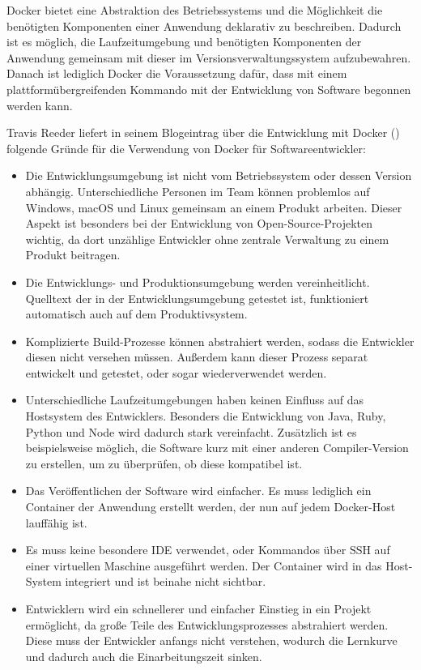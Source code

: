 Docker bietet eine Abstraktion des Betriebssystems und die Möglichkeit die benötigten Komponenten einer Anwendung deklarativ zu beschreiben.
Dadurch ist es möglich, die Laufzeitumgebung und benötigten Komponenten der Anwendung gemeinsam mit dieser im Versionsverwaltungssystem aufzubewahren.
Danach ist lediglich Docker die Voraussetzung dafür, dass mit einem plattformübergreifenden Kommando mit der Entwicklung von Software begonnen werden kann.

Travis Reeder liefert in seinem Blogeintrag über die Entwicklung mit Docker (\autocite{why-docker-for-development:online}) folgende Gründe für die Verwendung von Docker für Softwareentwickler:
\begin{itemize}
    \item Die Entwicklungsumgebung ist nicht vom Betriebssystem oder dessen Version abhängig. Unterschiedliche Personen im Team können problemlos auf Windows, macOS und Linux gemeinsam an einem Produkt arbeiten. Dieser Aspekt ist besonders bei der Entwicklung von Open-Source-Projekten wichtig, da dort unzählige Entwickler ohne zentrale Verwaltung zu einem Produkt beitragen.
    \item Die Entwicklungs- und Produktionsumgebung werden vereinheitlicht. Quelltext der in der Entwicklungsumgebung getestet ist, funktioniert automatisch auch auf dem Produktivsystem.
    \item Komplizierte Build-Prozesse können abstrahiert werden, sodass die Entwickler diesen nicht versehen müssen. Außerdem kann dieser Prozess separat entwickelt und getestet, oder sogar wiederverwendet werden.
    \item Unterschiedliche Laufzeitumgebungen haben keinen Einfluss auf das Hostsystem des Entwicklers. Besonders die Entwicklung von Java, Ruby, Python und Node wird dadurch stark vereinfacht. Zusätzlich ist es beispielsweise möglich, die Software kurz mit einer anderen Compiler-Version zu erstellen, um zu überprüfen, ob diese kompatibel ist.
    \item Das Veröffentlichen der Software wird einfacher. Es muss lediglich ein Container der Anwendung erstellt werden, der nun auf jedem Docker-Host lauffähig ist.
    \item Es muss keine besondere IDE verwendet, oder Kommandos über SSH auf einer virtuellen Maschine ausgeführt werden. Der Container wird in das Host-System integriert und ist beinahe nicht sichtbar.
    \item Entwicklern wird ein schnellerer und einfacher Einstieg in ein Projekt ermöglicht, da große Teile des Entwicklungsprozesses abstrahiert werden. Diese muss der Entwickler anfangs nicht verstehen, wodurch die Lernkurve und dadurch auch die Einarbeitungszeit sinken.
\end{itemize}


